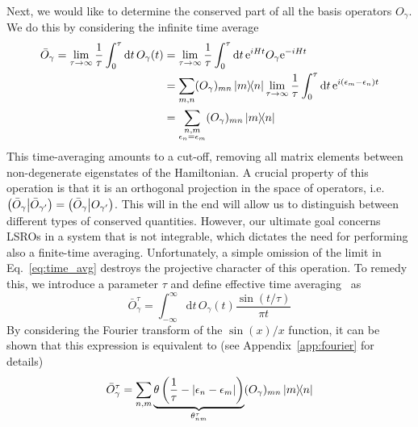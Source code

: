 Next, we would like to determine the conserved part of all the basis operators \(O_{\gamma}\). We do this
by considering the infinite time average
\begin{align}
  \bar{O}_{\gamma} = \lim_{\tau\to\infty}\frac{1}{\tau} \int_0^{\tau} \mathrm{d}t\, O_{\gamma}(t) & =
  \lim_{\tau\to\infty}\frac{1}{\tau} \int_0^{\tau} \mathrm{d}t\, \mathrm{e}^{i H t}O_{\gamma} \mathrm{e}^{-i H t} \nonumber                                                                                                                                       \\
                                                                                                  & = \sum_{m,n} (O_{\gamma})_{mn}\ketbra{m}{n} \lim_{\tau\to\infty} \frac{1}{\tau} \int_0^{\tau} \mathrm{d}t \, \mathrm{e}^{i(\epsilon_m-\epsilon_n)t} \nonumber \\
                                                                                                  & = \sum_{\substack{n,m                                                                                                                                         \\ \epsilon_n = \epsilon_m}} (O_{\gamma})_{mn}\ketbra{m}{n}
  \label{eq:time_avg}
\end{align}
This time-averaging amounts to a cut-off, removing all matrix elements between non-degenerate eigenstates
of the Hamiltonian. A crucial property of this operation is that it is an orthogonal projection
in the space of operators, i.e. \(\left(\bar{O}_{\gamma} \middle| \bar{O}_{\gamma^{\prime}}\right) = \left(\bar{O}_{\gamma} \middle| O_{\gamma^{\prime}}\right)\). This will
in the end will allow us to distinguish between different types of conserved quantities.
However, our ultimate goal concerns LSROs in a system that is not integrable, which dictates the
need for performing also a finite-time averaging. Unfortunately, a simple omission of the limit
in Eq.~\eqref{eq:time_avg} destroys the projective character of this operation. To remedy this,
we introduce a parameter \(\tau\) and define effective time averaging~\autocite{Mierzejewski2015}
as
\begin{equation}
  \bar{O}_{\gamma}^{\tau} = \int_{-\infty}^{\infty} \mathrm{d}t\, O_{\gamma}(t) \frac{\sin(t/\tau)}{\pi t}
\end{equation}
By considering the Fourier transform of the \(\sin(x)/x\) function, it can be shown that
this expression is equivalent to (see Appendix~\ref{app:fourier} for details)
\begin{equation}
  \bar{O}_{\gamma}^{\tau} = \sum_{n,m} \underbrace{\theta\left(\frac{1}{\tau} - |\epsilon_n - \epsilon_m|\right)}_{\theta_{nm}^{\tau}} (O_{\gamma})_{mn} \ketbra{m}{n}
  \label{eq:finite_time_avg}
\end{equation}

